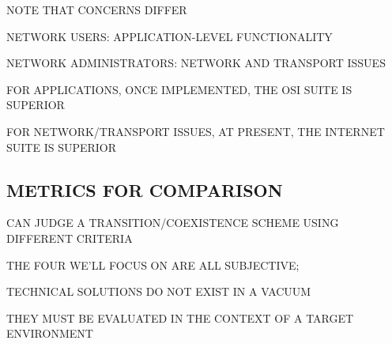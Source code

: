 \begin{bwslide}

\end{bwslide}


\begin{bwslide}

\begin{nrtc}
\item	NOTE THAT CONCERNS DIFFER
    \begin{nrtc}
    \item	NETWORK USERS: APPLICATION-LEVEL FUNCTIONALITY

    \item	NETWORK ADMINISTRATORS: NETWORK AND TRANSPORT ISSUES
    \end{nrtc}

\item	FOR APPLICATIONS, ONCE IMPLEMENTED, THE OSI SUITE IS SUPERIOR

\item	FOR NETWORK/TRANSPORT ISSUES, AT PRESENT,
	THE INTERNET SUITE IS SUPERIOR
\end{nrtc}
\end{bwslide}


\begin{bwslide}
\part*	{METRICS FOR COMPARISON}\bf

\begin{nrtc}
\item	CAN JUDGE A TRANSITION/COEXISTENCE SCHEME USING DIFFERENT
	CRITERIA

\item	THE FOUR WE'LL FOCUS ON ARE ALL SUBJECTIVE;
    \begin{nrtc}
    \item	TECHNICAL SOLUTIONS DO NOT EXIST IN A VACUUM

    \item	THEY MUST BE EVALUATED IN THE CONTEXT OF A TARGET ENVIRONMENT
    \end{nrtc}
\end{nrtc}
\end{bwslide}


